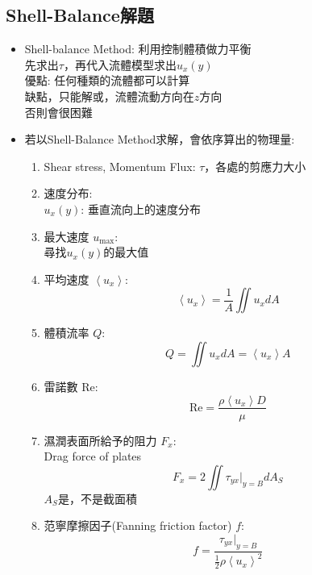 \documentclass[../main.tex]{subfiles}
\begin{document}
\subsection{Shell-Balance解題}
\begin{itemize}
  \item Shell-balance Method: 利用控制體積做力平衡\\
    先求出$\tau$，再代入流體模型求出$u_x(y)$\\
    優點: 任何種類的流體都可以計算\\
    缺點，只能解或，流體流動方向在$z$方向\\
    否則會很困難
  \item 若以Shell-Balance Method求解，會依序算出的物理量:
  \begin{enumerate}
    \item Shear stress, Momentum Flux: $\tau$，各處的剪應力大小
    \item 速度分布:\\
      $u_x(y)$: 垂直流向上的速度分布
    \item 最大速度 $u_{\text{max}}$: \\
      尋找$u_x(y)$的最大值
    \item 平均速度 $\left<u_x\right>$: 
    \begin{equation}
      \left<u_x\right> = \frac{1}{A}\iint u_x dA
    \end{equation}
    \item  體積流率 $Q$:
    \begin{equation}
      Q = \iint u_x dA = \left<u_x\right> A
    \end{equation}
    \item 雷諾數 $\text{Re}$: 
    \begin{equation}
      \text{Re} = \frac{\rho \left<u_x\right> D}{\mu}
    \end{equation}
    \item 濕潤表面所給予的阻力 $F_x$:\\
    Drag force of plates
    \begin{equation}
      F_x = 2\iint \tau_{yx}|_{y=B}dA_S
    \end{equation}
    $A_S$是，不是截面積
    \item 范寧摩擦因子(Fanning friction factor) $f$:
    \begin{equation}
      f = \frac{\tau_{yx}|_{y=B}}{\frac{1}{2}\rho \left<u_x\right>^2}
    \end{equation}
  \end{enumerate}

\end{itemize}
\end{document}
